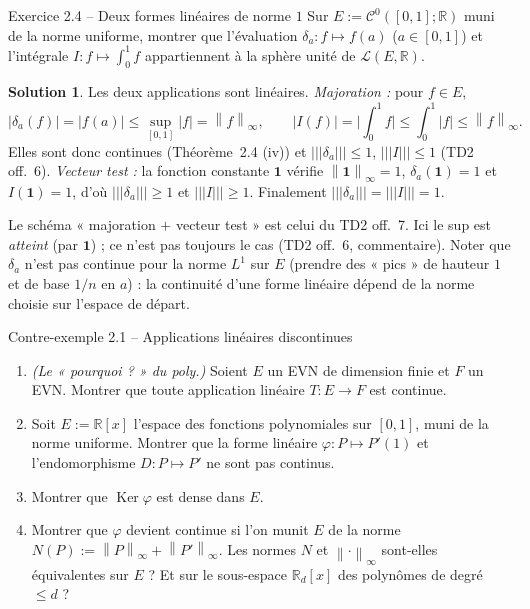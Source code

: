 \documentclass[11pt,a4paper]{article}
\newcommand{\R}{\mathbb{R}}
\newcommand{\norm}[1]{\left\|#1\right\|}
\newcommand{\opnorm}[1]{|\!|\!|#1|\!|\!|}
\newcommand{\Lc}{\mathcal{L}}
\newcommand{\Cz}{\mathcal{C}^0}
\DeclareMathOperator{\Ker}{Ker}
\theoremstyle{definition}
\newtheorem*{solution}{Solution}
\begin{document}
\begin{exo}{Exercice 2.4 -- Deux formes linéaires de norme $1$}
Sur $E:=\Cz([0,1];\R)$ muni de la norme uniforme, montrer que l'évaluation $\delta_a:f\mapsto f(a)$ ($a\in[0,1]$) et l'intégrale $I:f\mapsto\int_0^1f$ appartiennent à la sphère unité de $\Lc(E,\R)$.
\end{exo}

\begin{solution}
Les deux applications sont linéaires. \emph{Majoration :} pour $f\in E$,
\[
|\delta_a(f)|=|f(a)|\le\sup_{[0,1]}|f|=\norm f_\infty,\qquad
|I(f)|=\Big|\int_0^1f\Big|\le\int_0^1|f|\le\norm f_\infty .
\]
Elles sont donc continues (Théorème~2.4 (iv)) et $\opnorm{\delta_a}\le1$, $\opnorm I\le1$ (TD2 off.~6). \emph{Vecteur test :} la fonction constante $\mathbf 1$ vérifie $\norm{\mathbf 1}_\infty=1$, $\delta_a(\mathbf 1)=1$ et $I(\mathbf 1)=1$, d'où $\opnorm{\delta_a}\ge1$ et $\opnorm I\ge1$. Finalement $\opnorm{\delta_a}=\opnorm I=1$.
\end{solution}

\begin{commentaire}
Le schéma « majoration $+$ vecteur test » est celui du TD2 off.~7. Ici le sup est \emph{atteint} (par $\mathbf 1$) ; ce n'est pas toujours le cas (TD2 off.~6, commentaire). Noter que $\delta_a$ n'est pas continue pour la norme $L^1$ sur $E$ (prendre des « pics » de hauteur $1$ et de base $1/n$ en $a$) : la continuité d'une forme linéaire dépend de la norme choisie sur l'espace de départ.
\end{commentaire}

\begin{exo}{Contre-exemple 2.1 -- Applications linéaires discontinues}
\begin{enumerate}[label=(\alph*)]
  \item \emph{(Le « pourquoi ? » du poly.)} Soient $E$ un EVN de dimension finie et $F$ un EVN. Montrer que toute application linéaire $T:E\to F$ est continue.
  \item Soit $E:=\R[x]$ l'espace des fonctions polynomiales sur $[0,1]$, muni de la norme uniforme. Montrer que la forme linéaire $\varphi:P\mapsto P'(1)$ et l'endomorphisme $D:P\mapsto P'$ ne sont pas continus.
  \item Montrer que $\Ker\varphi$ est dense dans $E$.
  \item Montrer que $\varphi$ devient continue si l'on munit $E$ de la norme $N(P):=\norm P_\infty+\norm{P'}_\infty$. Les normes $N$ et $\norm\cdot_\infty$ sont-elles équivalentes sur $E$ ? Et sur le sous-espace $\R_d[x]$ des polynômes de degré $\le d$ ?
\end{enumerate}
\end{exo}
\end{document}
